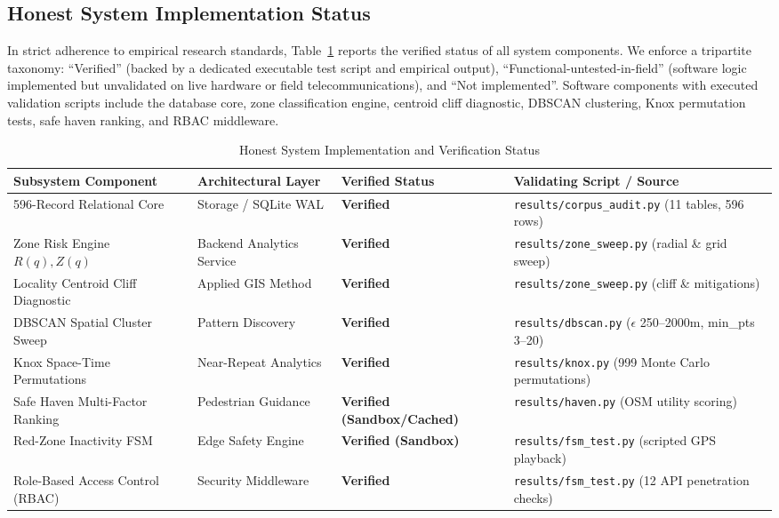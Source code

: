 \documentclass[conference]{IEEEtran}
\begin{document}
\subsection{Honest System Implementation Status}
In strict adherence to empirical research standards, Table~\ref{tab:status} reports the verified status of all system components. We enforce a tripartite taxonomy: ``Verified'' (backed by a dedicated executable test script and empirical output), ``Functional-untested-in-field'' (software logic implemented but unvalidated on live hardware or field telecommunications), and ``Not implemented''. Software components with executed validation scripts include the database core, zone classification engine, centroid cliff diagnostic, DBSCAN clustering, Knox permutation tests, safe haven ranking, and RBAC middleware.

\begin{table}[t]
\centering
\caption{Honest System Implementation and Verification Status}
\label{tab:status}
\begin{tabular}{llll}
\toprule
\textbf{Subsystem Component} & \textbf{Architectural Layer} & \textbf{Verified Status} & \textbf{Validating Script / Source} \\
\midrule
596-Record Relational Core & Storage / SQLite WAL & \textbf{Verified} & \texttt{results/corpus\_audit.py} (11 tables, 596 rows) \\
Zone Risk Engine $R(q), Z(q)$ & Backend Analytics Service & \textbf{Verified} & \texttt{results/zone\_sweep.py} (radial \& grid sweep) \\
Locality Centroid Cliff Diagnostic & Applied GIS Method & \textbf{Verified} & \texttt{results/zone\_sweep.py} (cliff \& mitigations) \\
DBSCAN Spatial Cluster Sweep & Pattern Discovery & \textbf{Verified} & \texttt{results/dbscan.py} ($\epsilon$ 250--2000m, min\_pts 3--20) \\
Knox Space-Time Permutations & Near-Repeat Analytics & \textbf{Verified} & \texttt{results/knox.py} (999 Monte Carlo permutations) \\
Safe Haven Multi-Factor Ranking & Pedestrian Guidance & \textbf{Verified (Sandbox/Cached)} & \texttt{results/haven.py} (OSM utility scoring) \\
Red-Zone Inactivity FSM & Edge Safety Engine & \textbf{Verified (Sandbox)} & \texttt{results/fsm\_test.py} (scripted GPS playback) \\
Role-Based Access Control (RBAC) & Security Middleware & \textbf{Verified} & \texttt{results/fsm\_test.py} (12 API penetration checks) \\

\end{tabular}
\end{table}
\end{document}
